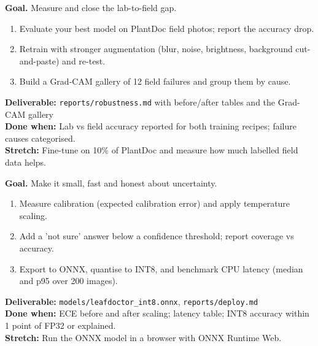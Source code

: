 \begin{tcolorbox}[enhanced,breakable,colback=white,colframe=sun,boxrule=0.8pt,arc=2pt,left=7pt,right=7pt,top=4pt,bottom=4pt,
  title={\bfseries Thursday --- Robustness on real field photos\hfill\normalfont\small 3 h},coltitle=white,colbacktitle=sun,fonttitle=\small]
\textbf{Goal.} Measure and close the lab-to-field gap.
\begin{enumerate}[itemsep=1pt,topsep=2pt]
  \item Evaluate your best model on PlantDoc field photos; report the accuracy drop.
  \item Retrain with stronger augmentation (blur, noise, brightness, background cut-and-paste) and re-test.
  \item Build a Grad-CAM gallery of 12 field failures and group them by cause.
\end{enumerate}
\textbf{\color{dataC}Deliverable:} \texttt{reports/robustness.md} with before/after tables and the Grad-CAM gallery\\
\textbf{\color{navy}Done when:} Lab vs field accuracy reported for both training recipes; failure causes categorised.\\
\textbf{\color{skillC}Stretch:} Fine-tune on 10\% of PlantDoc and measure how much labelled field data helps.
\end{tcolorbox}

\begin{tcolorbox}[enhanced,breakable,colback=white,colframe=sun,boxrule=0.8pt,arc=2pt,left=7pt,right=7pt,top=4pt,bottom=4pt,
  title={\bfseries Friday --- Calibration, quantisation and edge deployment\hfill\normalfont\small 2--3 h},coltitle=white,colbacktitle=sun,fonttitle=\small]
\textbf{Goal.} Make it small, fast and honest about uncertainty.
\begin{enumerate}[itemsep=1pt,topsep=2pt]
  \item Measure calibration (expected calibration error) and apply temperature scaling.
  \item Add a 'not sure' answer below a confidence threshold; report coverage vs accuracy.
  \item Export to ONNX, quantise to INT8, and benchmark CPU latency (median and p95 over 200 images).
\end{enumerate}
\textbf{\color{dataC}Deliverable:} \texttt{models/leafdoctor\_int8.onnx}, \texttt{reports/deploy.md}\\
\textbf{\color{navy}Done when:} ECE before and after scaling; latency table; INT8 accuracy within 1 point of FP32 or explained.\\
\textbf{\color{skillC}Stretch:} Run the ONNX model in a browser with ONNX Runtime Web.
\end{tcolorbox}

